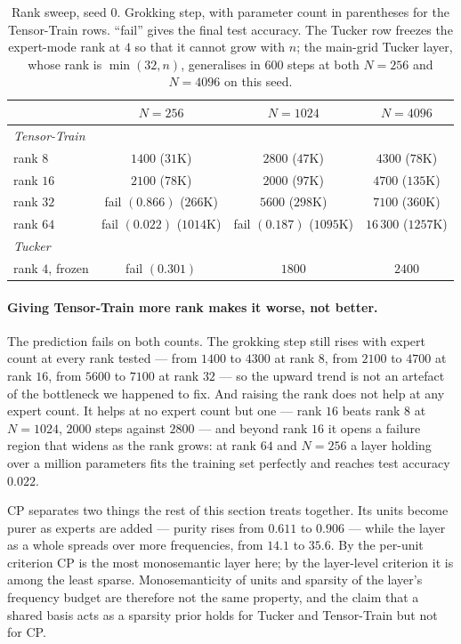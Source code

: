 \begin{table}[ht]
\centering
\caption{Rank sweep, seed $0$. Grokking step, with parameter count in
parentheses for the Tensor-Train rows. ``fail'' gives the final test accuracy.
The Tucker row freezes the expert-mode rank at $4$ so that it cannot grow with
$n$; the main-grid Tucker layer, whose rank is $\min(32, n)$, generalises in
$600$ steps at both $N = 256$ and $N = 4096$ on this seed.}
\label{tab:rank}
\footnotesize
\begin{tabular}{lccc}
\toprule
 & $N = 256$ & $N = 1024$ & $N = 4096$ \\
\midrule
\multicolumn{4}{l}{\emph{Tensor-Train}} \\
rank $8$  & $1400$ ($31$K)           & $2800$ ($47$K)            & $4300$ ($78$K) \\
rank $16$ & $2100$ ($78$K)           & $2000$ ($97$K)            & $4700$ ($135$K) \\
rank $32$ & fail $(0.866)$ ($266$K)  & $5600$ ($298$K)           & $7100$ ($360$K) \\
rank $64$ & fail $(0.022)$ ($1014$K) & fail $(0.187)$ ($1095$K)  & $16\,300$ ($1257$K) \\
\midrule
\multicolumn{4}{l}{\emph{Tucker}} \\
rank $4$, frozen & fail $(0.301)$ & $1800$ & $2400$ \\
\bottomrule
\end{tabular}
\end{table}

\paragraph{Giving Tensor-Train more rank makes it worse, not better.} The
prediction fails on both counts. The grokking step still rises with expert
count at every rank tested --- from $1400$ to $4300$ at rank $8$, from $2100$
to $4700$ at rank $16$, from $5600$ to $7100$ at rank $32$ --- so the upward
trend is not an artefact of the bottleneck we happened to fix. And raising the
rank does not help at any expert count. It helps at no expert count but one --- rank $16$ beats rank $8$ at $N = 1024$,
$2000$ steps against $2800$ --- and beyond rank $16$ it opens a failure region that widens as the rank grows: at rank $64$ and
$N = 256$ a layer holding over a million parameters fits the training set
perfectly and reaches test accuracy $0.022$.

CP separates two things the rest of this section treats together. Its units
become purer as experts are added --- purity rises from $0.611$ to $0.906$ ---
while the layer as a whole spreads over more frequencies, from $14.1$ to
$35.6$. By the per-unit criterion CP is the most monosemantic layer here; by
the layer-level criterion it is among the least sparse. Monosemanticity of
units and sparsity of the layer's frequency budget are therefore not the same
property, and the claim that a shared basis acts as a sparsity prior holds for
Tucker and Tensor-Train but not for CP.

